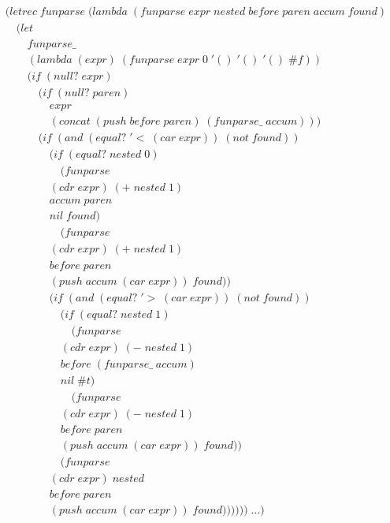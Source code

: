\begin{figure}[htp]
\caption{}\label{fig:letrecFunparse}
\begin{align*}
& (letrec \; funparse \; (lambda \; (funparse \; expr \; nested \; before \; paren \; accum \; found) \; 
\\& \quad (let \; 
\\& \qquad funparse\_ \; 
\\& \qquad (lambda \; (expr) \; (funparse \; expr \; 0 \; '() \; '() \; '() \; \#f))
\\& \qquad (if \; (null? \; expr)
\\& \qquad \quad (if \; (null? \; paren) \; 
\\& \qquad \qquad expr
\\& \qquad \qquad (concat \; (push \; before \; paren) \; (funparse\_ \; accum)))
\\& \qquad \quad (if \; (and \; (equal? \; '< \; (car \; expr)) \; (not \; found))
\\& \qquad \qquad (if \; (equal? \; nested \; 0)
\\& \qquad \qquad \quad (funparse \; 
\\& \qquad \qquad (cdr \; expr) \; (+ \; nested \; 1) \; 
\\& \qquad \qquad accum \; paren \; 
\\& \qquad \qquad nil \; found)
\\& \qquad \qquad \quad (funparse \; 
\\& \qquad \qquad (cdr \; expr) \; (+ \; nested \; 1) \; 
\\& \qquad \qquad before \; paren \; 
\\& \qquad \qquad (push \; accum \; (car \; expr)) \; found))
\\& \qquad \qquad (if \; (and \; (equal? \; '> \; (car \; expr)) \; (not \; found))
\\& \qquad \qquad \quad (if \; (equal? \; nested \; 1)
\\& \qquad \qquad \qquad (funparse \; 
\\& \qquad \qquad \quad (cdr \; expr) \; (- \; nested \; 1) \; 
\\& \qquad \qquad \quad before \; (funparse\_ \; accum) \; 
\\& \qquad \qquad \quad nil \; \#t)
\\& \qquad \qquad \qquad (funparse \; 
\\& \qquad \qquad \quad (cdr \; expr) \; (- \; nested \; 1) \; 
\\& \qquad \qquad \quad before \; paren \; 
\\& \qquad \qquad \quad (push \; accum \; (car \; expr)) \; found))
\\& \qquad \qquad \quad (funparse \; 
\\& \qquad \qquad (cdr \; expr) \; nested \; 
\\& \qquad \qquad before \; paren \; 
\\& \qquad \qquad (push \; accum \; (car \; expr)) \; found)))))) \; \dots)
\end{align*}
\end{figure}

